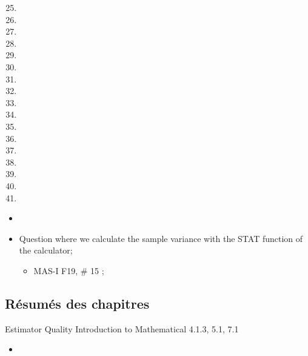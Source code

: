 \documentclass[12pt, titlepage, french]{report}
\begin{document}
\begin{ASM_chapter}
\begin{enumerate}
  \setcounter{enumi}{24}
	\item	{}
	\item	{}
	\item	{}
	\item	{}
	\item	{}
	\item	{}
	\item	{}
	\item	{}
	\item	{}
	\item	{}
	\item	{}
	\item	{}
	\item	{}
	\item	{}
	\item	{}
	\item	{}
	\item	{}
\end{enumerate}
\end{ASM_chapter}

\begin{YTB_vids}
\begin{itemize}
	\item	
\end{itemize}
\end{YTB_vids}

\begin{distributions}
\begin{itemize}
	\item	Question where we calculate the sample variance with the STAT function of the calculator;
		\begin{itemize}
		\item	MAS-I F19, \# 15	;
		\end{itemize}
\end{itemize}
\end{distributions}

\subsection{Résumés des chapitres}

\begin{CHPT_SUMM_AUTO_NUMB}[label = {L.-25}]{Estimator Quality}
Introduction to Mathematical  4.1.3, 5.1, 7.1
	\begin{itemize}
		\item	
	\end{itemize}
\end{CHPT_SUMM_AUTO_NUMB}
\end{document}
